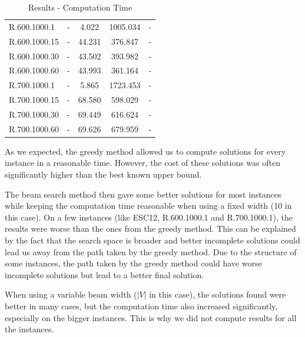 \documentclass[]{article}
\begin{document}
\begin{table}[H]
\begin{tabular}{lcccc}
			R.600.1000.1  & -              & 4.022         & 1005.034    & -             \\
			R.600.1000.15 & -              & 44.231        & 376.847     & -             \\
			R.600.1000.30 & -              & 43.502        & 393.982     & -             \\
			R.600.1000.60 & -              & 43.993        & 361.164     & -             \\
			R.700.1000.1  & -              & 5.865         & 1723.453    & -             \\
			R.700.1000.15 & -              & 68.580        & 598.029     & -             \\
			R.700.1000.30 & -              & 69.449        & 616.624     & -             \\
			R.700.1000.60 & -              & 69.626        & 679.959     & -             \\
		\end{tabular}
		\caption{Results - Computation Time}
		\label{table:results_time}
	\end{table}

	As we expected, the greedy method allowed us to compute solutions for every instance in a reasonable time. However, the cost of these solutions was often significantly higher than the best known upper bound.
	
	The beam search method then gave some better solutions for most instances while keeping the computation time reasonable when using a fixed width (10 in this case). On a few instances (like ESC12, R.600.1000.1 and R.700.1000.1), the results were worse than the ones from the greedy method. This can be explained by the fact that the search space is broader and better incomplete solutions could lead us away from the path taken by the greedy method. Due to the structure of some instances, the path taken by the greedy method could have worse incomplete solutions but lead to a better final solution.
	
	When using a variable beam width ($|V|$ in this case), the solutions found were better in many cases, but the computation time also increased significantly, especially on the bigger instances. This is why we did not compute results for all the instances.

    \newpage

	 
	
\end{document}
